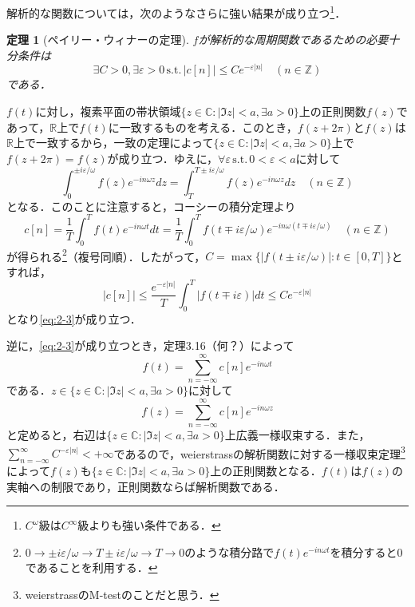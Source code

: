 \documentclass[dvipdfmx,a4j,10pt]{jsarticle}
\makeatletter
\theoremstyle{mystyle1}
\newtheorem{theorem}[definition]{定理}
\theoremstyle{mystyle3}
\theoremstyle{mystyle4}
\theoremstyle{mystyle2}
\renewenvironment{proof}[1][\proofname]{\par
  \pushQED{\qed}%
  \normalfont
  \topsep6\p@\@plus6\p@ \trivlist
  \item[\hskip\labelsep{\bfseries\sffamily #1}]\ignorespaces
}{%
  \popQED\endtrivlist\@endpefalse
}
\renewcommand\proofname{証明}
\newenvironment{thm}[1][]
{\begin{tcolorbox}[
    enhanced,
    boxrule=0pt,
    arc=0mm,
    frame hidden,
    borderline west={2pt}{-4pt}{red},
    breakable = true
    ]
    \begin{theorem}[#1]
}
{\end{theorem}\end{tcolorbox}}
\makeatother
\begin{document}
解析的な関数については，次のようなさらに強い結果が成り立つ\footnote{$C^\omega$級は$C^\infty$級よりも強い条件である．}．

\begin{thm}[ペイリー・ウィナーの定理]\label{thm:2-5}
    $f$が解析的な周期関数であるための必要十分条件は
    \begin{equation}\label{eq:2-3}
        \exists C>0,\exists \varepsilon>0\,\textrm{s.t.}\,|c[n]|\leq Ce^{-\varepsilon|n|}\quad(n\in\mathbb{Z})
    \end{equation}
    である．
\end{thm}

\begin{proof}
    $f(t)$に対し，複素平面の帯状領域$\{z\in\mathbb{C}:|\Im z|<a,\exists a>0\}$上の正則関数$f(z)$であって，$\mathbb{R}$上で$f(t)$に一致するものを考える．このとき，$f(z+2\pi)$と$f(z)$は$\mathbb{R}$上で一致するから，一致の定理によって$\{z\in\mathbb{C}:|\Im z|<a,\exists a>0\}$上で$f(z+2\pi)=f(z)$が成り立つ．ゆえに，$\forall \varepsilon\,\textrm{s.t.}\,0<\varepsilon<a$に対して
    \[
        \int_0^{\pm i\varepsilon/\omega}f(z)e^{-in\omega z}dz=\int_T^{T\pm i\varepsilon/\omega}f(z)e^{-in\omega z}dz\quad(n\in\mathbb{Z})
    \]
    となる．このことに注意すると，コーシーの積分定理より
    \[
        c[n]=\frac{1}{T}\int_0^T f(t)e^{-in\omega t}dt=\frac{1}{T}\int_0^T f(t\mp i\varepsilon/\omega)e^{-in\omega (t\mp i\varepsilon/\omega)}\quad(n\in\mathbb{Z})
    \]
    が得られる\footnote{$0\to \pm i\varepsilon/\omega\to T\pm i\varepsilon/\omega\to T \to 0$のような積分路で$f(t)e^{-in\omega t}$を積分すると$0$であることを利用する．}（複号同順）．したがって，$C=\max\{|f(t\pm i\varepsilon/\omega)|:t\in[0,T]\}$とすれば，
    \[
        |c[n]|\leq\frac{e^{-\varepsilon|n|}}{T}\int_0^T|f(t\mp i\varepsilon)|dt\leq Ce^{-\varepsilon|n|}
    \]
    となり\eqref{eq:2-3}が成り立つ．

    逆に，\eqref{eq:2-3}が成り立つとき，定理3.16（何？）によって
    \[
        f(t)=\sum_{n=-\infty}^\infty c[n]e^{-in\omega t}
    \]
    である．$z\in \{z\in\mathbb{C}:|\Im z|<a,\exists a>0\}$に対して
    \[
        f(z)=\sum_{n=-\infty}^\infty c[n]e^{-in\omega z}
    \]
    と定めると，右辺は$\{z\in\mathbb{C}:|\Im z|<a,\exists a>0\}$上広義一様収束する．また，$\sum_{n=-\infty}^\infty C^{-\varepsilon|n|}<+\infty$であるので，weierstrassの解析関数に対する一様収束定理\footnote{weierstrassのM-testのことだと思う．}によって$f(z)$も$\{z\in\mathbb{C}:|\Im z|<a,\exists a>0\}$上の正則関数となる．$f(t)$は$f(z)$の実軸への制限であり，正則関数ならば解析関数である．
\end{proof}
\end{document}

